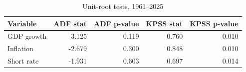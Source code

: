 \begin{table}

\caption{\label{tab:stationarity}Unit-root tests, 1961--2025}
\centering
\begin{tabular}[t]{lrrrr}
\toprule
Variable & ADF stat & ADF p-value & KPSS stat & KPSS p-value\\
\midrule
GDP growth & -3.125 & 0.119 & 0.760 & 0.010\\
Inflation & -2.679 & 0.300 & 0.848 & 0.010\\
Short rate & -1.931 & 0.603 & 0.697 & 0.014\\
\bottomrule
\end{tabular}
\end{table}
